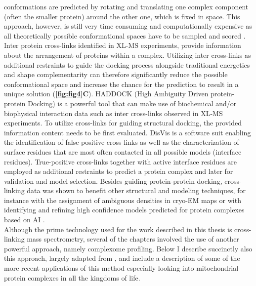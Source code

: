 conformations are predicted by rotating and translating one complex component (often the smaller protein) around the other one, which is fixed in space. This approach, however, is still very time consuming and computationally expensive as all theoretically possible conformational spaces have to be sampled and scored \cite{Dominguez_2003, van_Zundert_2016}. Inter protein cross-links identified in XL-MS experiments, provide information about the arrangement of proteins within a complex. Utilizing inter cross-links as additional restraints to guide the docking process alongside traditional energetics and shape complementarity can therefore significantly reduce the possible conformational space and increase the chance for the prediction to result in a unique solution \cite{Dominguez_2003, van_Zundert_2016} (\textbf{\autoref{fig:fig4}C}). HADDOCK \cite{Dominguez_2003, Orban-Nemeth_2018} (High Ambiguity Driven protein-protein Docking) is a powerful tool that can make use of biochemical and/or biophysical interaction data such as inter cross-links observed in XL-MS experiments. To utilize cross-links for guiding structural docking, the provided information content needs to be first evaluated. DisVis \cite{van_Zundert_2015} is a software suit enabling the identification of false-positive cross-links as well as the characterization of surface residues that are most often contacted in all possible models (interface residues). True-positive cross-links together with active interface residues are employed as additional restraints to predict a protein complex and later for validation and model selection. Besides guiding protein-protein docking, cross-linking data was shown to benefit other structural and modeling techniques, for instance with the assignment of ambiguous densities in cryo-EM maps \cite{Herzog_2012, Kyrilis_2021b} or with identifying and refining high confidence models predicted for protein complexes based on AI \cite{Burke_2021}.\\
Although the prime technology used for the work described in this thesis is cross-linking mass spectrometry, several of the chapters involved the use of another powerful approach, namely complexome profiling. Below I describe succinctly also this approach, largely adapted from \cite{Cabrera-Orefice_2022}, and include a description of some of the more recent applications of this method especially looking into mitochondrial protein complexes in all the kingdoms of life.

